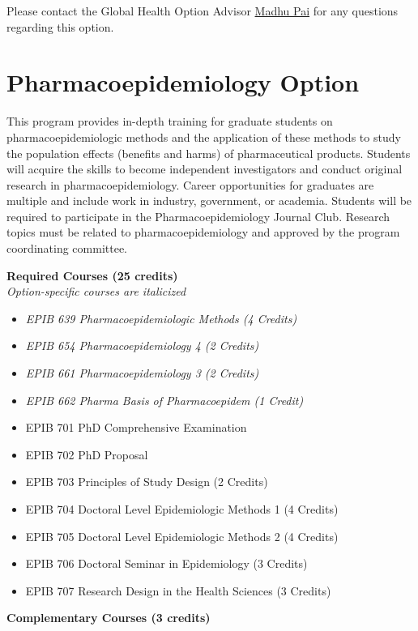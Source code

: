 \documentclass[
]{book}
\providecommand{\tightlist}{%
  \setlength{\itemsep}{0pt}\setlength{\parskip}{0pt}}
\begin{document}
Please contact the Global Health Option Advisor \href{mailto:madhukar.pai@mcgill.ca}{Madhu Pai} for any questions regarding this option.

\hypertarget{pharmacoepidemiology-option}{%
\section{Pharmacoepidemiology Option}\label{pharmacoepidemiology-option}}

This program provides in-depth training for graduate students on pharmacoepidemiologic methods and the application of these methods to study the population effects (benefits and harms) of pharmaceutical products. Students will acquire the skills to become independent investigators and conduct original research in pharmacoepidemiology. Career opportunities for graduates are multiple and include work in industry, government, or academia. Students will be required to participate in the Pharmacoepidemiology Journal Club. Research topics must be related to pharmacoepidemiology and approved by the program coordinating committee.

\textbf{Required Courses (25 credits)}\\
\emph{Option-specific courses are italicized}

\begin{itemize}
\tightlist
\item
  \emph{EPIB 639 Pharmacoepidemiologic Methods (4 Credits)}
\item
  \emph{EPIB 654 Pharmacoepidemiology 4 (2 Credits)}
\item
  \emph{EPIB 661 Pharmacoepidemiology 3 (2 Credits)}
\item
  \emph{EPIB 662 Pharma Basis of Pharmacoepidem (1 Credit)}
\item
  EPIB 701 PhD Comprehensive Examination
\item
  EPIB 702 PhD Proposal
\item
  EPIB 703 Principles of Study Design (2 Credits)
\item
  EPIB 704 Doctoral Level Epidemiologic Methods 1 (4 Credits)
\item
  EPIB 705 Doctoral Level Epidemiologic Methods 2 (4 Credits)
\item
  EPIB 706 Doctoral Seminar in Epidemiology (3 Credits)
\item
  EPIB 707 Research Design in the Health Sciences (3 Credits)
\end{itemize}

\textbf{Complementary Courses (3 credits)}
\end{document}
